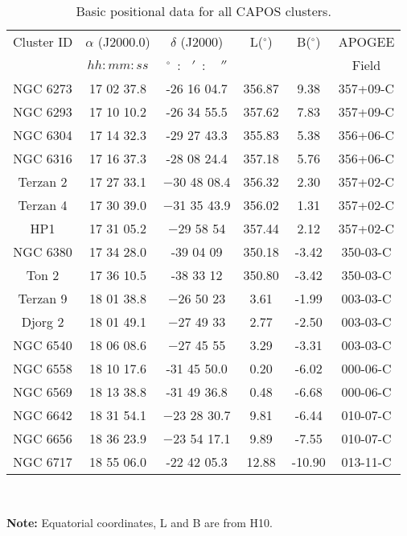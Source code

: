 \documentclass[onecolumn]{aa}
\begin{document}
\begin{table*}
	\begin{center}
		\setlength{\tabcolsep}{2.mm}  
		\caption{Basic positional data for all CAPOS clusters.}
		\begin{tabular}{c c c c c c }
			\hline
			Cluster ID & $\alpha$ (J2000.0) & $\delta$ (J2000) & L($^\circ $) & B($^\circ $) & APOGEE  \\
			&   $hh:mm:ss$ & $^\circ $~:~ $ ' $~: ~ $''$  &  & & Field  \\
			\hline
NGC 6273 & 17 02 37.8 & -26 16 04.7  & 356.87  &  9.38& 357+09-C \\
NGC 6293  &  17 10 10.2 & -26 34 55.5  & 357.62  &  7.83 & 357+09-C \\
NGC 6304 & 17 14 32.3 &  -29 27 43.3  & 355.83  &  5.38 & 356+06-C \\
NGC 6316 & 17 16 37.3 &  -28 08 24.4  & 357.18  &  5.76 & 356+06-C \\
Terzan 2 & 17 27 33.1 & $-$30 48 08.4 & 356.32  &  2.30 & 357+02-C \\
Terzan 4 &  17 30 39.0 & $-$31 35 43.9  & 
356.02  &  1.31 & 357+02-C \\
HP1	&  17 31 05.2 & $-$29 58 54 & 
357.44  &  2.12 & 357+02-C \\
NGC 6380 & 17 34 28.0 &  -39 04 09  &   350.18 &  -3.42 & 350-03-C \\
Ton 2 & 17 36 10.5  & -38 33 12     & 350.80  & -3.42 & 350-03-C \\
Terzan 9 &  18 01 38.8 & $-$26 50 23 & 
3.61  & -1.99 & 003-03-C \\
Djorg 2	& 18 01 49.1 & $-$27 49 33 & 
2.77  & -2.50 & 003-03-C \\
NGC 6540	&  18 06 08.6 & $-$27 45 55 & 3.29  & -3.31 & 003-03-C \\
NGC 6558 & 18 10 17.6 &  -31 45 50.0  &   0.20  & -6.02 & 000-06-C \\
NGC 6569 & 18 13 38.8 &  -31 49 36.8  &   0.48  & -6.68 & 000-06-C \\
NGC 6642	& 18 31 54.1 & $-$23 28 30.7 & 9.81 & -6.44 & 010-07-C \\
NGC 6656	&  18 36 23.9 & $-$23 54 17.1 & 9.89 &  -7.55 & 010-07-C \\
NGC 6717  & 18 55 06.0 &  -22 42 05.3  &  12.88 & -10.90 & 013-11-C \\

			\hline
		\end{tabular}  \label{basicparamsall}\\
	\end{center}
	\raggedright{{\bf Note:} Equatorial coordinates, L and B are from H10. }
\end{table*}
\end{document}
